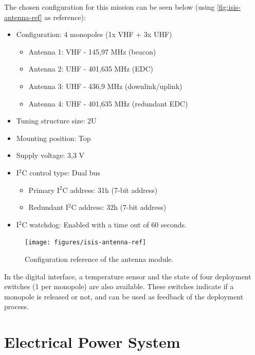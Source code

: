 The chosen configuration for this mission can be seen below (using \autoref{fig:isis-antenna-ref} as reference):

\begin{itemize}
    \item Configuration: 4 monopoles (1x VHF + 3x UHF)
        \begin{itemize}
            \item Antenna 1: VHF - 145,97 MHz (beacon)
            \item Antenna 2: UHF - 401,635 MHz (EDC)
            \item Antenna 3: UHF - 436,9 MHz (downlink/uplink)
            \item Antenna 4: UHF - 401,635 MHz (redundant EDC)
        \end{itemize}
    \item Tuning structure size: 2U
    \item Mounting position: Top
    \item Supply voltage: 3,3 V
    \item I$^{2}$C control type: Dual bus
        \begin{itemize}
            \item Primary I$^{2}$C address: 31h (7-bit address)
            \item Redundant I$^{2}$C address: 32h (7-bit address)
        \end{itemize}
    \item I$^{2}$C watchdog: Enabled with a time out of 60 seconds.
\end{itemize}

\begin{figure}[!ht]
    \begin{center}
        \texttt{[image: figures/isis-antenna-ref]}
        \caption{Configuration reference of the antenna module.}
        \label{fig:isis-antenna-ref}
    \end{center}
\end{figure}

In the digital interface, a temperature sensor and the state of four deployment switches (1 per monopole) are also available. These switches indicate if a monopole is released or not, and can be used as feedback of the deployment process.

\section{Electrical Power System}

